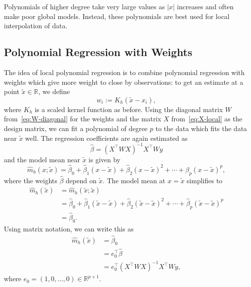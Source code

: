 \documentclass[
  a4paper,
]{article}
\theoremstyle{definition}
\theoremstyle{definition}
\theoremstyle{definition}
\theoremstyle{definition}
\theoremstyle{remark}
\begin{document}
Polynomials of higher degree take very large values as \(|x|\) increases and
often make poor global models. Instead, these polynomials are best used for
local interpolation of data.

\hypertarget{polynomial-regression-with-weights}{%
\subsection{Polynomial Regression with Weights}\label{polynomial-regression-with-weights}}

The idea of local polynomial regression is to combine polynomial regression
with weights which give more weight to close by observations: to get an
estimate at a point \(\tilde x \in \mathbb{R}\), we define
\begin{equation*}
  w_i
  := K_h(\tilde x - x_i),
\end{equation*}
where \(K_h\) is a scaled kernel function as before. Using the diagonal
matrix \(W\) from~\eqref{eq:W-diagonal} for the weights and the matrix
\(X\) from~\eqref{eq:X-local} as the design matrix, we can fit a polynomial
of degree \(p\) to the data which fits the data near \(\tilde x\) well.
The regression coefficients are again estimated as
\begin{equation*}
  \hat\beta
  = (X^\top W X)^{-1} X^\top W y
\end{equation*}
and the model mean near \(\tilde x\) is given by
\begin{equation*}
  \hat m_h(x; \tilde x)
  = \hat\beta_0 + \hat\beta_1 (x - \tilde x) + \hat\beta_2 (x - \tilde x)^2 + \cdots + \hat\beta_p (x - \tilde x)^p,
\end{equation*}
where the weights \(\hat\beta\) depend on \(\tilde x\). The model mean at
\(x = \tilde x\) simplifies to
\begin{align*}
  \hat m_h(\tilde x)
  &= \hat m_h(\tilde x; \tilde x) \\
  &= \hat\beta_0 + \hat\beta_1 (\tilde x - \tilde x) + \hat\beta_2 (\tilde x - \tilde x)^2 + \cdots + \hat\beta_p (\tilde x - \tilde x)^p \\
  &= \hat\beta_0.
\end{align*}
Using matrix notation, we can write this as
\begin{align*}
  \hat m_h(\tilde x)
  &= \hat\beta_0 \\
  &= e_0^\top \hat\beta \\
  &= e_0^\top (X^\top W X)^{-1} X^\top W y,
\end{align*}
where \(e_0 = (1, 0, \ldots, 0) \in \mathbb{R}^{p+1}\).
\end{document}
